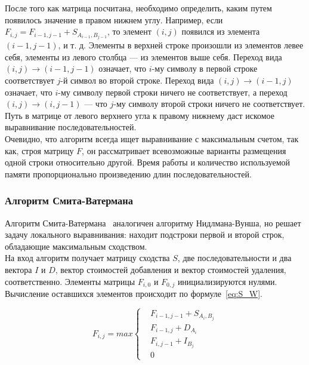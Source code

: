 \indent  После того как матрица посчитана, необходимо определить, каким путем появилось значение в правом нижнем углу. Например, если $F_{i,j} = F_{i-1,j-1} +S_{A_{i-1},B_{j-1}}$, то элемент $(i, j)$ появился из элемента $(i - 1, j - 1)$, и т. д. Элементы в верхней строке произошли из элементов левее себя, элементы из левого столбца --- из элементов выше себя. Переход вида $(i, j) \rightarrow (i - 1, j - 1)$ означает, что $i$-му символу в первой строке соответствует $j$-й символ во второй строке. Переход вида $(i, j) \rightarrow (i - 1, j)$ означает, что $i$-му символу первой строки ничего не соответствует, а переход $(i, j) \rightarrow (i, j - 1)$ --- что $j$-му символу второй строки ничего не соответствует. Путь в матрице от левого верхнего угла к правому нижнему даст искомое выравнивание последовательностей.\\
\indent Очевидно, что алгоритм всегда ищет выравнивание с максимальным счетом, так как, строя матрицу $F$, он рассматривает всевозможные варианты размещения одной строки относительно другой. Время работы и количество используемой памяти пропорционально произведению длин последовательностей.

\subsubsection[Алгоритм Смита-Ватермана]{\large Алгоритм Смита-Ватермана}
\hspace{\parindent} Алгоритм Смита-Ватермана~\cite{SWalgo} аналогичен алгоритму Нидлмана-Вунша, но решает задачу локального выравнивания: находит подстроки первой и второй строк, обладающие максимальным сходством.\\
\indent На вход алгоритм получает матрицу сходства $S$, две последовательности и два вектора $I$ и $D$, вектор стоимостей добавления и вектор стоимостей удаления, соответственно. Элементы матрицы $F_{i,0}$ и $F_{0,j}$ инициализируются нулями.  Вычисление оставшихся элементов происходит по формуле~\ref{eq:S_W}.

\begin{equation}\label{eq:S_W}
F_{i,j} = max\left\{
	\begin{aligned}
		& F_{i-1,j-1} + S_{A_i,B_j}\\
		& F_{i-1,j} + D_{A_i}\\
		& F_{i,j-1} + I_{B_j}\\
		& 0
	\end{aligned}
	\right.
\end{equation}

